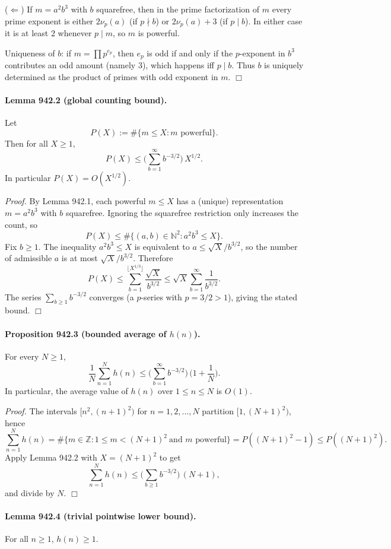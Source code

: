 ($\Leftarrow$) If $m=a^2b^3$ with $b$ squarefree, then in the prime factorization of $m$ every prime exponent is either $2\nu_p(a)$ (if $p\nmid b$) or $2\nu_p(a)+3$ (if $p\mid b$). In either case it is at least $2$ whenever $p\mid m$, so $m$ is powerful.

Uniqueness of $b$: if $m=\prod p^{e_p}$, then $e_p$ is odd if and only if the $p$-exponent in $b^3$ contributes an odd amount (namely $3$), which happens iff $p\mid b$. Thus $b$ is uniquely determined as the product of primes with odd exponent in $m$.
\hfill $\Box$

\paragraph{Lemma 942.2 (global counting bound).}
Let
\[
P(X):=\#\{m\le X: m\text{ powerful}\}.
\]
Then for all $X\ge 1$,
\[
P(X) \le \Big(\sum_{b=1}^{\infty} b^{-3/2}\Big)\, X^{1/2}.
\]
In particular $P(X)=O(X^{1/2})$.

\emph{Proof.}
By Lemma 942.1, each powerful $m\le X$ has a (unique) representation $m=a^2b^3$ with $b$ squarefree. Ignoring the squarefree restriction only increases the count, so
\[
P(X) \le \#\{(a,b)\in\mathbb{N}^2: a^2b^3\le X\}.
\]
Fix $b\ge 1$. The inequality $a^2b^3\le X$ is equivalent to $a\le \sqrt{X}/b^{3/2}$, so the number of admissible $a$ is at most $\sqrt{X}/b^{3/2}$. Therefore
\[
P(X) \le \sum_{b=1}^{\lfloor X^{1/3}\rfloor} \frac{\sqrt{X}}{b^{3/2}} \le \sqrt{X}\sum_{b=1}^{\infty} \frac{1}{b^{3/2}}.
\]
The series $\sum_{b\ge 1} b^{-3/2}$ converges (a $p$-series with $p=3/2>1$), giving the stated bound.
\hfill $\Box$

\paragraph{Proposition 942.3 (bounded average of $h(n)$).}
For every $N\ge 1$,
\[
\frac{1}{N}\sum_{n=1}^N h(n) \le \Big(\sum_{b=1}^{\infty} b^{-3/2}\Big)\,\Big(1+\frac{1}{N}\Big).
\]
In particular, the average value of $h(n)$ over $1\le n\le N$ is $O(1)$.

\emph{Proof.}
The intervals $[n^2,(n+1)^2)$ for $n=1,2,\dots,N$ partition $[1,(N+1)^2)$, hence
\[
\sum_{n=1}^N h(n)=\#\{m\in\mathbb{Z}:1\le m<(N+1)^2\ \text{and $m$ powerful}\}=P((N+1)^2-1)\le P((N+1)^2).
\]
Apply Lemma 942.2 with $X=(N+1)^2$ to get
\[
\sum_{n=1}^N h(n)\le \Big(\sum_{b\ge 1} b^{-3/2}\Big)\,(N+1),
\]
and divide by $N$.
\hfill $\Box$

\paragraph{Lemma 942.4 (trivial pointwise lower bound).}
For all $n\ge 1$, $h(n)\ge 1$.

